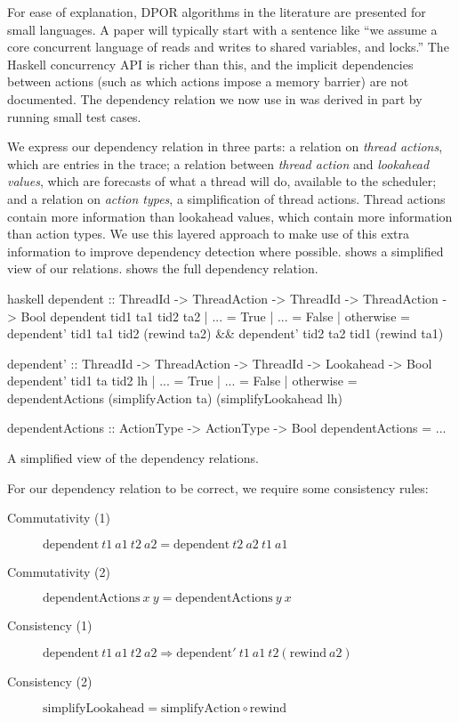 For ease of explanation, DPOR algorithms in the literature are
presented for small languages.  A paper will typically start with a
sentence like ``we assume a core concurrent language of reads and
writes to shared variables, and locks.''  The Haskell concurrency API
is richer than this, and the implicit dependencies between actions
(such as which actions impose a memory barrier) are not documented.
The dependency relation we now use in \dejafu{} was derived in part by
running small test cases.

We express our dependency relation in three parts: a relation on
\emph{thread actions}, which are entries in the trace; a relation
between \emph{thread action} and \emph{lookahead values}, which are
forecasts of what a thread will do, available to the scheduler; and a
relation on \emph{action types}, a simplification of thread actions.
Thread actions contain more information than lookahead values, which
contain more information than action types.  We use this layered
approach to make use of this extra information to improve dependency
detection where possible.   shows a simplified
view of our relations.   shows the full dependency
relation.

\begin{listing}
\centering
\begin{cminted}{haskell}
dependent :: ThreadId -> ThreadAction -> ThreadId -> ThreadAction -> Bool
dependent tid1 ta1 tid2 ta2
  | ...       = True
  | ...       = False
  | otherwise = dependent' tid1 ta1 tid2 (rewind ta2) &&
                dependent' tid2 ta2 tid1 (rewind ta1)

dependent' :: ThreadId -> ThreadAction -> ThreadId -> Lookahead -> Bool
dependent' tid1 ta tid2 lh
  | ...       = True
  | ...       = False
  | otherwise = dependentActions (simplifyAction    ta)
                                 (simplifyLookahead lh)

dependentActions :: ActionType -> ActionType -> Bool
dependentActions = ...
\end{cminted}
\caption{A simplified view of the \dejafu{} dependency relations.}\label{lst:deprel-simp}
\end{listing}

For our dependency relation to be correct, we require some consistency
rules:

\begin{description}
\item[Commutativity (1)]
  $\mathrm{dependent}~t1~a1~t2~a2 = \mathrm{dependent}~t2~a2~t1~a1$
\item[Commutativity (2)]
  $\mathrm{dependentActions}~x~y = \mathrm{dependentActions}~y~x$
\item[Consistency (1)]
  $\mathrm{dependent}~t1~a1~t2~a2 \Rightarrow \mathrm{dependent'}~t1~a1~t2 (\mathrm{rewind}~a2)$
\item[Consistency (2)]
  $\mathrm{simplifyLookahead} = \mathrm{simplifyAction} \circ \mathrm{rewind}$
\end{description}

